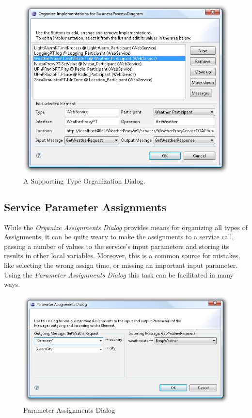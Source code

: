 \begin{figure}[ht]
	\centering
	\includegraphics[width=.5\textwidth]{figures/features/dialog.png}
	\caption{A Supporting Type Organization Dialog.}
	\label{fig:dialog}
\end{figure}



\subsection{Service Parameter Assignments}

While the \emph{Organize Assignments Dialog} provides means for organizing all
types of Assignments, it can be quite weary to make the assignments to a service
call, passing a number of values to the service's input parameters and storing
its results in other local variables.  Moreover, this is a common source for
mistakes, like selecting the wrong assign time, or missing an important input
parameter.  Using the \emph{Parameter Assignments Dialog} this task can be
facilitated in many ways.

\begin{figure}[ht]
	\centering
	\includegraphics[width=.6\textwidth]{figures/features/paramAssign.png}
	\caption{Parameter Assignments Dialog}
	\label{fig:paramAssign}
\end{figure}

